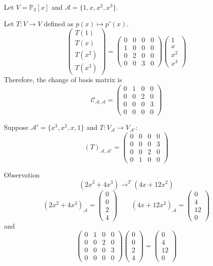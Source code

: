 \begin{example}
Let $V=\mathbb{P}_3[x]$ and $\mathcal{A}=\{1,x,x^2,x^3\}$.

Let $T:V\to V$ defined as $p(x)\mapsto p'(x)$.
\[
\begin{pmatrix}
T(1)\\T(x)\\T(x^2)\\T(x^3)
\end{pmatrix}
=
\begin{pmatrix}
0&0&0&0\\1&0&0&0\\0&2&0&0\\0&0&3&0
\end{pmatrix}\begin{pmatrix}
1\\x\\x^2\\x^3
\end{pmatrix}
\]
Therefore, the change of basis matrix is
\[
\mathcal{C}_{\mathcal{A},\mathcal{A}}=\begin{pmatrix}
0&1&0&0\\0&0&2&0\\0&0&0&3\\0&0&0&0
\end{pmatrix}
\]

Suppose $\mathcal{A}'=\{x^3,x^2,x,1\}$ and $T:V_\mathcal{A}\to V_{\mathcal{A}'}$:
\[
(T)_{\mathcal{A},\mathcal{A}'}
=\begin{pmatrix}
0&0&0&0\\0&0&0&3\\0&0&2&0\\0&1&0&0
\end{pmatrix}
\]

Observation
\[
(2x^2+4x^3)\to^T(4x+12x^2)
\]
\[
(2x^2+4x^3)_{\mathcal{A}}
=
\begin{pmatrix}
0\\0\\2\\4
\end{pmatrix}
\qquad
(4x+12x^2)_{\mathcal{A}}
=
\begin{pmatrix}
0\\4\\12\\0
\end{pmatrix}
\]
and
\[
\begin{pmatrix}
0&1&0&0\\0&0&2&0\\0&0&0&3\\0&0&0&0
\end{pmatrix}\begin{pmatrix}
0\\0\\2\\4
\end{pmatrix}=\begin{pmatrix}
0\\4\\12\\0
\end{pmatrix}
\]
\end{example}

